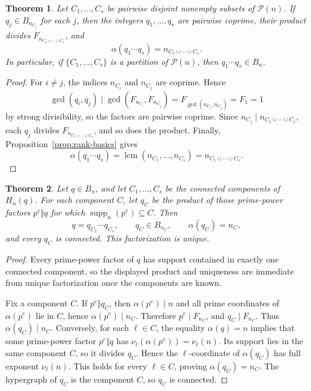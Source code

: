 \documentclass[11pt,letterpaper]{article}
\numberwithin{equation}{section}
\theoremstyle{plain}
\newtheorem{theorem}{Theorem}[section]
\theoremstyle{definition}
\theoremstyle{remark}
\DeclareMathOperator{\lcmop}{lcm}
\begin{document}
\begin{theorem}\label{thm:coprime-embedding}
Let $C_1,\ldots,C_s$ be pairwise disjoint nonempty subsets of
$\mathcal P(n)$. If $q_j\in B_{n_{C_j}}$ for each $j$, then the integers
$q_1,\ldots,q_s$ are pairwise coprime, their product divides
$F_{n_{C_1\cup\cdots\cup C_s}}$, and
\[
\alpha(q_1\cdots q_s)=n_{C_1\cup\cdots\cup C_s}.
\]
In particular, if $\{C_1,\ldots,C_s\}$ is a partition of $\mathcal P(n)$,
then $q_1\cdots q_s\in B_n$.
\end{theorem}

\begin{proof}
For $i\ne j$, the indices $n_{C_i}$ and $n_{C_j}$ are coprime. Hence
\[
\gcd(q_i,q_j)\mid \gcd(F_{n_{C_i}},F_{n_{C_j}})
=F_{\gcd(n_{C_i},n_{C_j})}=F_1=1
\]
by strong divisibility, so the factors are pairwise coprime. Since
$n_{C_j}\mid n_{C_1\cup\cdots\cup C_s}$, each $q_j$ divides
$F_{n_{C_1\cup\cdots\cup C_s}}$, and so does the product. Finally,
Proposition~\ref{prop:rank-basics} gives
\[
\alpha(q_1\cdots q_s)=\lcmop(n_{C_1},\ldots,n_{C_s})
=n_{C_1\cup\cdots\cup C_s}.
\]
\end{proof}

\begin{theorem}\label{thm:birth-connected-factorization}
Let $q\in B_n$, and let $C_1,\ldots,C_s$ be the connected components of
$H_n(q)$. For each component $C$, let $q_C$ be the product of those
prime-power factors $p^e\Vert q$ for which
\(\operatorname{supp}_n(p^e)\subseteq C\). Then
\[
q=q_{C_1}\cdots q_{C_s},\qquad q_C\in B_{n_C},
\qquad \alpha(q_C)=n_C,
\]
and every $q_C$ is connected. This factorization is unique.
\end{theorem}

\begin{proof}
Every prime-power factor of $q$ has support contained in exactly one connected
component, so the displayed product and uniqueness are immediate from unique
factorization once the components are known.

Fix a component $C$. If \(p^e\Vert q_C\), then
\(\alpha(p^e)\mid n\) and all prime coordinates of \(\alpha(p^e)\) lie in
$C$, hence \(\alpha(p^e)\mid n_C\). Therefore \(p^e\mid F_{n_C}\), and
\(q_C\mid F_{n_C}\). Thus \(\alpha(q_C)\mid n_C\).
Conversely, for each \(\ell\in C\), the equality \(\alpha(q)=n\) implies
that some prime-power factor \(p^e\Vert q\) has
\(\nu_\ell(\alpha(p^e))=\nu_\ell(n)\). Its support lies in the same component
$C$, so it divides \(q_C\). Hence the \(\ell\)-coordinate of
\(\alpha(q_C)\) has full exponent \(\nu_\ell(n)\). This holds for every
\(\ell\in C\), proving \(\alpha(q_C)=n_C\). The hypergraph of \(q_C\) is the
component \(C\), so \(q_C\) is connected.
\end{proof}
\end{document}

